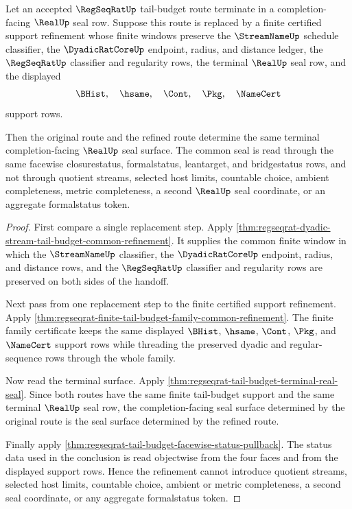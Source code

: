 \begin{theorem}
\label{thm:regseqrat-tail-budget-support-refinement-invariance}
Let an accepted $\RegSeqRatUp$ tail-budget route terminate in a
completion-facing $\RealUp$ seal row. Suppose this route is replaced by a
finite certified support refinement whose finite windows preserve the
$\StreamNameUp$ schedule classifier, the $\DyadicRatCoreUp$ endpoint, radius,
and distance ledger, the $\RegSeqRatUp$ classifier and regularity rows, the
terminal $\RealUp$ seal row, and the displayed
$$
\BHist,\quad \hsame,\quad \Cont,\quad \Pkg,\quad \NameCert
$$
support rows.

Then the original route and the refined route determine the same terminal
completion-facing $\RealUp$ seal surface. The common seal is read through the
same facewise closurestatus, formalstatus, leantarget, and bridgestatus rows,
and not through quotient streams, selected host limits, countable choice,
ambient completeness, metric completeness, a second $\RealUp$ seal coordinate,
or an aggregate formalstatus token.
\end{theorem}
\begin{proof}
First compare a single replacement step. Apply
\autoref{thm:regseqrat-dyadic-stream-tail-budget-common-refinement}. It supplies
the common finite window in which the $\StreamNameUp$ classifier, the
$\DyadicRatCoreUp$ endpoint, radius, and distance rows, and the
$\RegSeqRatUp$ classifier and regularity rows are preserved on both sides of
the handoff.

Next pass from one replacement step to the finite certified support
refinement. Apply
\autoref{thm:regseqrat-finite-tail-budget-family-common-refinement}. The finite
family certificate keeps the same displayed $\BHist$, $\hsame$, $\Cont$,
$\Pkg$, and $\NameCert$ support rows while threading the preserved dyadic and
regular-sequence rows through the whole family.

Now read the terminal surface. Apply
\autoref{thm:regseqrat-tail-budget-terminal-real-seal}. Since both routes have
the same finite tail-budget support and the same terminal $\RealUp$ seal row,
the completion-facing seal surface determined by the original route is the seal
surface determined by the refined route.

Finally apply \autoref{thm:regseqrat-tail-budget-facewise-status-pullback}. The
status data used in the conclusion is read objectwise from the four faces and
from the displayed support rows. Hence the refinement cannot introduce quotient
streams, selected host limits, countable choice, ambient or metric completeness,
a second seal coordinate, or any aggregate formalstatus token.
\end{proof}

